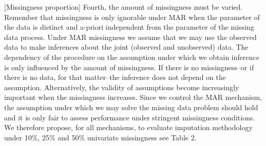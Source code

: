 \documentclass[bimj,fleqn]{w-art}
\theoremstyle{plain}
\theoremstyle{definition}
\begin{document}
[Missingness proportion]
Fourth, the amount of missingness must be varied. Remember that missingness is only ignorable under MAR when the parameter of the data is distinct and a-priori independent from the parameter of the missing data process. Under MAR missingness we assume that we may use the observed data to make inferences about the joint (observed and unobserved) data. The dependency of the procedure on the assumption under which we obtain inference is only influenced by the amount of missingness. If there is no missingness--or if there is no data, for that matter--the inference does not depend on the assumption. Alternatively, the validity of assumptions become increasingly important when the missingness increases. Since we control the MAR mechanism, the assumption under which we may solve the missing data problem should hold and it is only fair to assess performance under stringent missingness conditions. We therefore propose, for all mechanisms, to evaluate imputation methodology under 10\%, 25\% and 50\% univariate missingness see Table 2.
\end{document}
